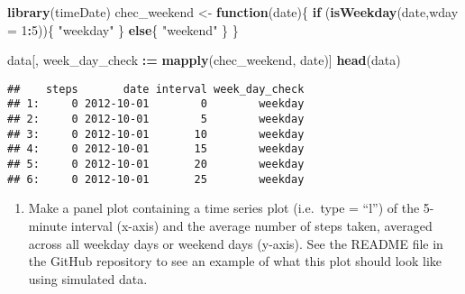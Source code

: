 \documentclass[
]{article}
\newenvironment{Shaded}{\begin{snugshade}}{\end{snugshade}}
\newcommand{\ControlFlowTok}[1]{\textcolor[rgb]{0.13,0.29,0.53}{\textbf{#1}}}
\newcommand{\DataTypeTok}[1]{\textcolor[rgb]{0.13,0.29,0.53}{#1}}
\newcommand{\DecValTok}[1]{\textcolor[rgb]{0.00,0.00,0.81}{#1}}
\newcommand{\ErrorTok}[1]{\textcolor[rgb]{0.64,0.00,0.00}{\textbf{#1}}}
\newcommand{\KeywordTok}[1]{\textcolor[rgb]{0.13,0.29,0.53}{\textbf{#1}}}
\newcommand{\NormalTok}[1]{#1}
\newcommand{\OperatorTok}[1]{\textcolor[rgb]{0.81,0.36,0.00}{\textbf{#1}}}
\newcommand{\StringTok}[1]{\textcolor[rgb]{0.31,0.60,0.02}{#1}}
\providecommand{\tightlist}{%
  \setlength{\itemsep}{0pt}\setlength{\parskip}{0pt}}
\begin{document}
\begin{Shaded}
\begin{Highlighting}[]
\KeywordTok{library}\NormalTok{(timeDate)}
\NormalTok{chec_weekend <-}\StringTok{ }\ControlFlowTok{function}\NormalTok{(date)\{}
  \ControlFlowTok{if}\NormalTok{ (}\KeywordTok{isWeekday}\NormalTok{(date,}\DataTypeTok{wday =} \DecValTok{1}\OperatorTok{:}\DecValTok{5}\NormalTok{))\{}
    \StringTok{"weekday"}
\NormalTok{  \}}
  \ControlFlowTok{else}\NormalTok{\{}
    \StringTok{"weekend"}
\NormalTok{  \}}
\NormalTok{\}}
\end{Highlighting}
\end{Shaded}

\begin{Shaded}
\begin{Highlighting}[]
\NormalTok{data[, week_day_check }\OperatorTok{:}\ErrorTok{=}\StringTok{ }\KeywordTok{mapply}\NormalTok{(chec_weekend, date)]}
\KeywordTok{head}\NormalTok{(data)}
\end{Highlighting}
\end{Shaded}

\begin{verbatim}
##    steps       date interval week_day_check
## 1:     0 2012-10-01        0        weekday
## 2:     0 2012-10-01        5        weekday
## 3:     0 2012-10-01       10        weekday
## 4:     0 2012-10-01       15        weekday
## 5:     0 2012-10-01       20        weekday
## 6:     0 2012-10-01       25        weekday
\end{verbatim}

\begin{enumerate}
\def\labelenumi{\arabic{enumi}.}
\setcounter{enumi}{1}
\tightlist
\item
  Make a panel plot containing a time series plot
  (i.e.~\color{red}{\verb|type = "l"|}type = ``l'') of the 5-minute
  interval (x-axis) and the average number of steps taken, averaged
  across all weekday days or weekend days (y-axis). See the README file
  in the GitHub repository to see an example of what this plot should
  look like using simulated data.
\end{enumerate}

\begin{Shaded}
\end{Shaded}
\end{document}

